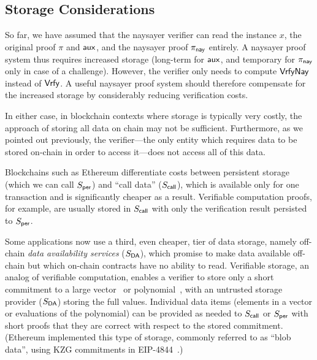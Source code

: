 \subsection{Storage Considerations}\label{sec:naysayer_storage}

So far, we have assumed that the naysayer verifier can read the instance $x$, the original proof $\pi$ and $\mathsf{aux}$, and the naysayer proof $\pi_{\mathsf{nay}}$ entirely. A naysayer proof system thus requires increased storage (long-term for $\mathsf{aux}$, and temporary for $\pi_{\mathsf{nay}}$ only in case of a challenge). However, the verifier only needs to compute ${\mathsf{Vrfy}}\mathsf{Nay}$ instead of $\mathsf{Vrfy}$. A useful naysayer proof system should therefore compensate for the increased storage by considerably reducing verification costs.

In either case, in blockchain contexts where storage is typically very costly, the approach of storing all data on chain may not be sufficient. Furthermore, as we pointed out previously, the verifier---the only entity which requires data to be stored on-chain in order to access it---does not access all of this data.

Blockchains such as Ethereum differentiate costs between persistent storage (which we can call $S_{\sf per}$) and ``call data'' ($S_{\sf call}$), which is available only for one transaction and is significantly cheaper as a result. Verifiable computation proofs, for example, are usually stored in $S_{\sf call}$ with only the verification result persisted to $S_{\sf per}$.

Some applications now use a third, even cheaper, tier of data storage, namely off-chain \emph{data availability services} ($S_{\sf DA}$), which promise to make data available off-chain but which on-chain contracts have no ability to read. Verifiable storage, an analog of verifiable computation, enables a verifier to store only a short commitment to a large vector~\cite{PKC:CatFio13,C:Merkle87} or polynomial~\cite{AC:KatZavGol10}, with an untrusted storage provider ($S_{\sf DA}$) storing the full values. Individual data items (elements in a vector or evaluations of the polynomial) can be provided as needed to $S_{\sf call}$ or $S_{\sf per}$ with short proofs that they are correct with respect to the stored commitment.  (Ethereum implemented this type of storage, commonly referred to as ``blob data'', using KZG commitments in EIP-4844~\cite{eip4844}.)

